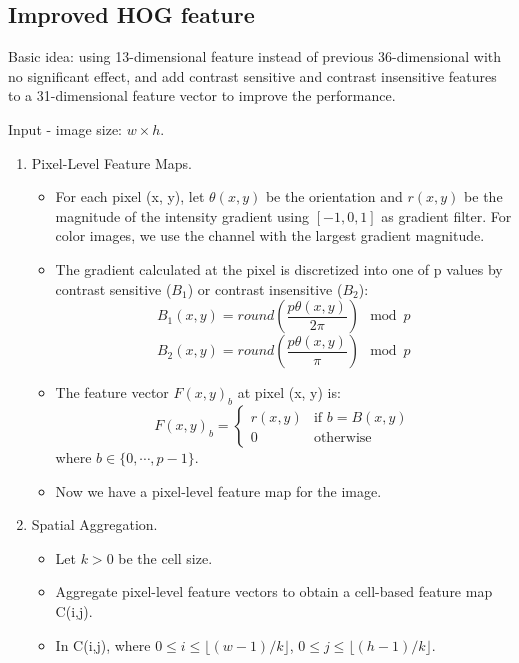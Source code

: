 \documentclass[12pt]{article}
\numberwithin{equation}{section}
\begin{document}
\subsection{Improved HOG feature \cite{felzenszwalb2010object}}
Basic idea: using 13-dimensional feature instead of previous 36-dimensional with no significant effect, and
add  contrast sensitive and contrast insensitive features to a 31-dimensional feature vector to improve the 
performance. \par
Input - image size: $w \times h$.
\begin{enumerate}
	\item Pixel-Level Feature Maps. 
		\begin{itemize}
			\item For each pixel (x, y), let $\theta(x,y)$ be the orientation and $r(x,y)$ be the magnitude of 
			the intensity gradient using $[-1, 0, 1]$ as gradient filter. For color images, we use the channel with 
			the largest gradient magnitude. 
			\item The gradient calculated at the pixel is discretized into one of p values by contrast sensitive
			($B_1$) or contrast insensitive ($B_2$):
				\begin{equation}
					B_1(x,y) = round(\frac{p \theta(x,y)}{2 \pi})\mod p 
				\end{equation}
				\begin{equation}
					B_2(x,y) = round(\frac{p \theta(x,y)}{\pi})\mod p
				\end{equation}
			\item The feature vector $F(x, y)_b$ at pixel (x, y) is: 
				\begin{equation}
					F(x,y)_b=
					\begin{cases}
						r(x,y) & \text{if } b = B(x,y) \\
						0 & \text{otherwise}
    					\end{cases}
				\end{equation}
			where $b \in \{0, \cdots , p-1 \}$.
			\item Now we have a pixel-level feature map for the image.
		\end{itemize}
	\item Spatial Aggregation.
		\begin{itemize}
			\item Let $k > 0$ be the cell size.
			\item Aggregate pixel-level feature vectors to obtain a cell-based feature map C(i,j).
			\item In C(i,j), where $0 \le i \le \lfloor{(w-1)/k}\rfloor$, $0 \le j \le \lfloor{(h-1)/k}\rfloor$.

\end{itemize}
\end{enumerate}
\end{document}
